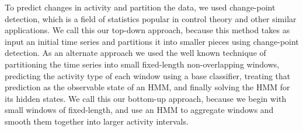 To predict changes in activity and partition the data, we used change-point detection,
which is a field of statistics popular in control theory and other similar
applications. We call this our top-down approach, because this
method takes as input an initial time series and partitions it into smaller pieces using
change-point detection. As an alternate approach we
used the well known technique of partitioning the time series into small fixed-length
non-overlapping windows, predicting the activity type of each window
using a base classifier, treating that prediction as the observable
state of an HMM, and finally solving the HMM for its hidden states. We call
this our bottom-up approach, because we begin with small windows of fixed-length,
and use an HMM to aggregate windows and smooth them together into
larger activity intervals.
